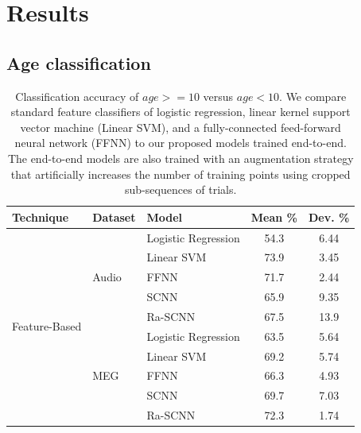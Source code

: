 \documentclass[fleqn,10pt]{wlscirep}
\begin{document}
\section*{Results}

\subsection*{Age classification}

\begin{table}[htp]
  \caption{Classification accuracy of $age >= 10$ versus $age < 10$. We compare standard feature classifiers of logistic regression, linear kernel support vector machine (Linear SVM), and a fully-connected feed-forward neural network (FFNN) to our proposed models trained end-to-end. The end-to-end models are also trained with an augmentation strategy that artificially increases the number of training points using cropped sub-sequences of trials.}
  \centering
  \begin{tabular}{l | l  l | c | c }
    \toprule
    \textbf{Technique} & \textbf{Dataset} & \textbf{Model} & \textbf{Mean \%} & \textbf{Dev. \%} \\
    \toprule
    \multirow{10}{*}{Feature-Based} & \multirow{5}{*}{Audio} & Logistic Regression      & 54.3 & 6.44  \\
                                    &                        & Linear SVM               & 73.9 & 3.45  \\
                                    &                        & FFNN                     & 71.7 & 2.44  \\
                                    &                        & SCNN                     & 65.9 & 9.35  \\
                                    &                        & Ra-SCNN                  & 67.5 & 13.9  \\
    \cline{2-5}
                                    & \multirow{5}{*}{MEG}   & Logistic Regression    & 63.5 & 5.64  \\
                                    &                        & Linear SVM             & 69.2 & 5.74  \\
                                    &                        & FFNN                   & 66.3 & 4.93  \\
                                    &                        & SCNN                   & 69.7 & 7.03  \\
                                    &                        & Ra-SCNN                & 72.3 & 1.74  \\    

\end{tabular}
\end{table}
\end{document}

